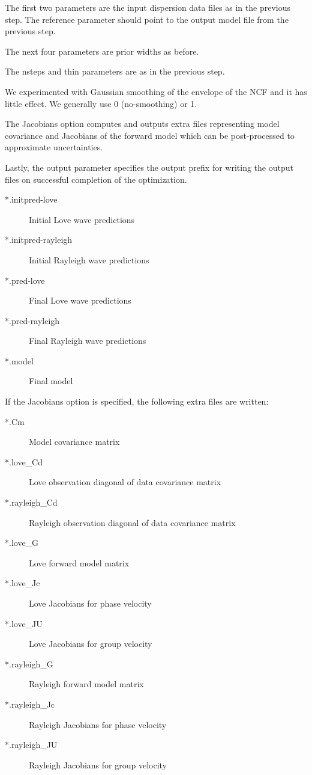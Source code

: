 \documentclass{article}
\begin{document}
The first two parameters are the input dispersion data files as in the
previous step. The reference parameter should point to the output
model file from the previous step.

The next four parameters are prior widths as before.

The nsteps and thin parameters are as in the previous step.

We experimented with Gaussian smoothing of the envelope of the NCF and
it has little effect. We generally use 0 (no-smoothing) or 1.

The Jacobians option computes and outputs extra files representing
model covariance and Jacobians of the forward model which can be
post-processed to approximate uncertainties.

Lastly, the output parameter specifies the output prefix for writing
the output files on successful completion of the optimization.

\begin{description}
\item[*.initpred-love] Initial Love wave predictions
\item[*.initpred-rayleigh] Initial Rayleigh wave predictions
\item[*.pred-love] Final Love wave predictions
\item[*.pred-rayleigh] Final Rayleigh wave predictions
\item[*.model] Final model
\end{description}

If the Jacobians option is specified, the following extra files are
written:

\begin{description}
\item[*.Cm] Model covariance matrix
\item[*.love\_Cd] Love observation diagonal of data covariance matrix
\item[*.rayleigh\_Cd] Rayleigh observation diagonal of data covariance matrix
\item[*.love\_G] Love forward model matrix
\item[*.love\_Jc] Love Jacobians for phase velocity
\item[*.love\_JU] Love Jacobians for group velocity
\item[*.rayleigh\_G]  Rayleigh forward model matrix
\item[*.rayleigh\_Jc] Rayleigh Jacobians for phase velocity
\item[*.rayleigh\_JU] Rayleigh Jacobians for group velocity
\end{description}  
\end{document}
